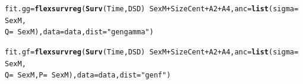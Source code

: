 \documentclass{article}\usepackage[]{graphicx}\usepackage[]{color}
\makeatletter
\newcommand{\hlstr}[1]{\textcolor[rgb]{0.192,0.494,0.8}{#1}}%
\newcommand{\hlopt}[1]{\textcolor[rgb]{0,0,0}{#1}}%
\newcommand{\hlstd}[1]{\textcolor[rgb]{0.345,0.345,0.345}{#1}}%
\newcommand{\hlkwb}[1]{\textcolor[rgb]{0.69,0.353,0.396}{#1}}%
\newcommand{\hlkwc}[1]{\textcolor[rgb]{0.333,0.667,0.333}{#1}}%
\newcommand{\hlkwd}[1]{\textcolor[rgb]{0.737,0.353,0.396}{\textbf{#1}}}%
\newenvironment{kframe}{%
 \def\at@end@of@kframe{}%
 \ifinner\ifhmode%
  \def\at@end@of@kframe{\end{minipage}}%
  \begin{minipage}{\columnwidth}%
 \fi\fi%
 \def\FrameCommand##1{\hskip\@totalleftmargin \hskip-\fboxsep
 \colorbox{shadecolor}{##1}\hskip-\fboxsep
     \hskip-\linewidth \hskip-\@totalleftmargin \hskip\columnwidth}%
 \MakeFramed {\advance\hsize-\width
   \@totalleftmargin\z@ \linewidth\hsize
   \@setminipage}}%
 {\par\unskip\endMakeFramed%
 \at@end@of@kframe}
\newenvironment{knitrout}{}{} %
\makeatother
\begin{document}
\begin{knitrout}
\color{fgcolor}\begin{kframe}
\begin{alltt}
\hlstd{fit.gg} \hlkwb{=} \hlkwd{flexsurvreg}\hlstd{(}\hlkwd{Surv}\hlstd{(Time, DSD)} \hlopt{~} \hlstd{SexM} \hlopt{+} \hlstd{SizeCent} \hlopt{+} \hlstd{A2} \hlopt{+} \hlstd{A4,} \hlkwc{anc} \hlstd{=} \hlkwd{list}\hlstd{(}\hlkwc{sigma} \hlstd{=} \hlopt{~}\hlstd{SexM,}
    \hlkwc{Q} \hlstd{=} \hlopt{~}\hlstd{SexM),} \hlkwc{data} \hlstd{= data,} \hlkwc{dist} \hlstd{=} \hlstr{"gengamma"}\hlstd{)}

\hlstd{fit.gf} \hlkwb{=} \hlkwd{flexsurvreg}\hlstd{(}\hlkwd{Surv}\hlstd{(Time, DSD)} \hlopt{~} \hlstd{SexM} \hlopt{+} \hlstd{SizeCent} \hlopt{+} \hlstd{A2} \hlopt{+} \hlstd{A4,} \hlkwc{anc} \hlstd{=} \hlkwd{list}\hlstd{(}\hlkwc{sigma} \hlstd{=} \hlopt{~}\hlstd{SexM,}
    \hlkwc{Q} \hlstd{=} \hlopt{~}\hlstd{SexM,} \hlkwc{P} \hlstd{=} \hlopt{~}\hlstd{SexM),} \hlkwc{data} \hlstd{= data,} \hlkwc{dist} \hlstd{=} \hlstr{"genf"}\hlstd{)}


\end{alltt}
\end{kframe}
\end{knitrout}
\end{document}
